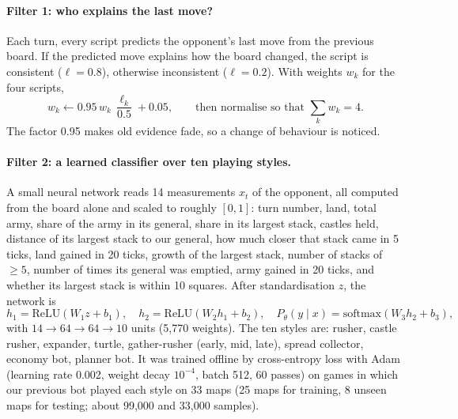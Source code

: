 \paragraph{Filter 1: who explains the last move?} Each turn, every script predicts the opponent's last move
from the previous board. If the predicted move explains how the board changed, the script is consistent
($\ell=0.8$), otherwise inconsistent ($\ell=0.2$). With weights $w_k$ for the four scripts,
\begin{equation}
w_k\leftarrow 0.95\,w_k\,\frac{\ell_k}{0.5}+0.05,\qquad\text{then normalise so that }\textstyle\sum_k w_k=4.
\end{equation}
The factor 0.95 makes old evidence fade, so a change of behaviour is noticed.

\paragraph{Filter 2: a learned classifier over ten playing styles.} A small neural network reads 14
measurements $x_t$ of the opponent, all computed from the board alone and scaled to roughly $[0,1]$: turn
number, land, total army, share of the army in its general, share in its largest stack, castles held,
distance of its largest stack to our general, how much closer that stack came in 5 ticks, land gained in 20
ticks, growth of the largest stack, number of stacks of $\ge 5$, number of times its general was emptied, army
gained in 20 ticks, and whether its largest stack is within 10 squares. After standardisation $z$, the
network is
\begin{equation}
h_1=\mathrm{ReLU}(W_1z+b_1),\quad h_2=\mathrm{ReLU}(W_2h_1+b_2),\quad P_\theta(y\mid x)=\mathrm{softmax}(W_3h_2+b_3),
\end{equation}
with $14\to 64\to 64\to 10$ units (5,770 weights). The ten styles are: rusher, castle rusher, expander,
turtle, gather-rusher (early, mid, late), spread collector, economy bot, planner bot. It was trained offline
by cross-entropy loss with Adam (learning rate 0.002, weight decay $10^{-4}$, batch 512, 60 passes) on games in
which our previous bot played each style on 33 maps (25 maps for training, 8 unseen maps for testing; about
99,000 and 33,000 samples).

